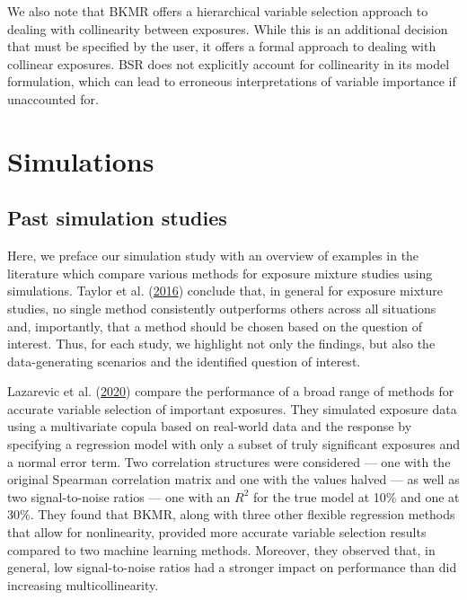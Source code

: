 \documentclass[12pt, twoside]{amherstthesis}
\begin{document}
We also note that BKMR offers a hierarchical variable selection approach to dealing with collinearity between exposures. While this is an additional decision that must be specified by the user, it offers a formal approach to dealing with collinear exposures. BSR does not explicitly account for collinearity in its model formulation, which can lead to erroneous interpretations of variable importance if unaccounted for.

\hypertarget{sims}{%
\chapter{Simulations}\label{sims}}

\hypertarget{past-simulation-studies}{%
\section{Past simulation studies}\label{past-simulation-studies}}

Here, we preface our simulation study with an overview of examples in the literature which compare various methods for exposure mixture studies using simulations. Taylor et al. (\protect\hyperlink{ref-taylor_statistical_2016}{2016}) conclude that, in general for exposure mixture studies, no single method consistently outperforms others across all situations and, importantly, that a method should be chosen based on the question of interest. Thus, for each study, we highlight not only the findings, but also the data-generating scenarios and the identified question of interest.

Lazarevic et al. (\protect\hyperlink{ref-lazarevic_performance_2020}{2020}) compare the performance of a broad range of methods for accurate variable selection of important exposures. They simulated exposure data using a multivariate copula based on real-world data and the response by specifying a regression model with only a subset of truly significant exposures and a normal error term. Two correlation structures were considered --- one with the original Spearman correlation matrix and one with the values halved --- as well as two signal-to-noise ratios --- one with an \(R^2\) for the true model at 10\% and one at 30\%. They found that BKMR, along with three other flexible regression methods that allow for nonlinearity, provided more accurate variable selection results compared to two machine learning methods. Moreover, they observed that, in general, low signal-to-noise ratios had a stronger impact on performance than did increasing multicollinearity.
\end{document}
